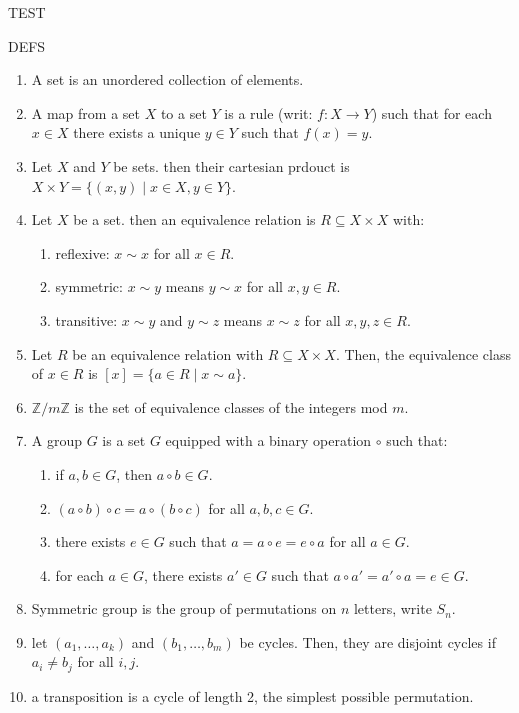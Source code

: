 

\begin{center}
	TEST
\end{center}
DEFS
\begin{enumerate}
	\item A set is an unordered collection of elements. 
	\item A map from a set $X$ to a set $Y$ is a rule (writ: $f: X \to Y$) such that for each $x \in X$ there exists a unique $y \in Y$ such that $f(x)=y$. 
	\item Let $X$ and $Y$ be sets. then their cartesian prdouct is $X \times Y = \{(x,y) \mid x \in X, y \in Y\}$. 
	\item Let $X$ be a set. then an equivalence relation is $R \subseteq X \times X$ with:
	\begin{enumerate}
		\item reflexive: $x \sim x$ for all $x \in R$. 
		\item symmetric: $x \sim y$ means $y \sim x$ for all $x,y \in R$. 
		\item transitive: $x \sim y$ and $y \sim z$ means $x \sim z$ for all $x,y,z \in R$. 
	\end{enumerate}
	\item Let $R$ be an equivalence relation with $R \subseteq X \times X$. Then, the equivalence class of $x \in R$ is $[x] = \{a \in R \mid x \sim a\}$. 
	\item $\mathbb{Z}/m\mathbb{Z}$ is the set of equivalence classes of the integers mod $m$. 
	\item A group $G$ is a set $G$ equipped with a binary operation $\circ$ such that: 
	\begin{enumerate}
		\item if $a,b \in G$, then $a \circ b \in G$. 
		\item $(a \circ b) \circ c = a \circ (b \circ c)$ for all $a,b,c \in G$. 
		\item there exists $e \in G$ such that $a = a \circ e = e \circ a$ for all $a \in G$. 
		\item for each $a \in G$, there exists $a' \in G$ such that $a \circ a' = a' \circ a = e \in G$. 
	\end{enumerate}
	\item Symmetric group is the group of permutations on $n$ letters, write $S_n$. 
	\item let $(a_1,\dots,a_k)$ and $(b_1,\dots,b_m)$ be cycles. Then, they are disjoint cycles if $a_i \neq b_j$ for all $i,j$. 
	\item a transposition is a cycle of length 2, the simplest possible permutation. 

\end{enumerate}
